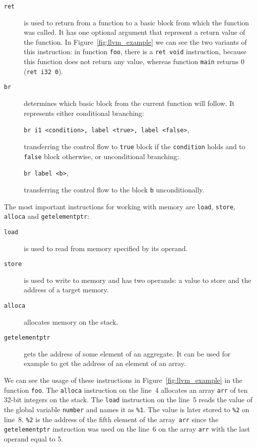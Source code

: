 \begin{description}
\item[\texttt{ret}] is used to return from a function to a basic block
from which the function was called. It has one optional argument that represent
a return value of the function. In Figure~\ref{fig:llvm_example} we can see the
two variants of this instruction: in function \texttt{foo}, there is a
\texttt{ret void} instruction, because this function does not return any value,
whereas function \texttt{main} returns 0 (\texttt{ret i32 0}).

\item[\texttt{br}] determines which basic block from the current function
will follow. It represents either conditional branching:

\texttt{br i1 <condition>, label <true>, label <false>},

transferring the control flow to \texttt{true} block if the \texttt{condition} holds and to
\texttt{false} block otherwise, or unconditional branching:

\texttt{br label <b>},

transferring the control flow to the block \texttt{b} unconditionally.
\end{description}

The most important instructions for working with memory are \texttt{load},
\texttt{store}, \texttt{alloca} and \texttt{getelementptr}:
\begin{description}
\item[\texttt{load}] is used to read from memory specified by its operand.
\item[\texttt{store}] is used to write to memory and has two operands: a value
to store and the address of a target memory.
\item[\texttt{alloca}] allocates memory on the stack.
\item[\texttt{getelementptr}] gets the address of some element of an aggregate.
It can be used for example to get the address of an element of an array.
\end{description}
We can see the usage of these instructions in Figure~\ref{fig:llvm_example} in
the function \texttt{foo}. The \texttt{alloca} instruction on the line~4 allocates an
array \texttt{arr} of ten 32-bit integers on the stack. The \texttt{load}
instruction on the line~5 reads the value of the global variable \texttt{number} and
names it as \texttt{\%1}. The value is later stored to \texttt{\%2} on line~8.
\texttt{\%2} is the address of the fifth element of the array~\texttt{arr} since the
\texttt{getelementptr} instruction was used on the line~6 on the array \texttt{arr}
with the last operand equal to 5.

